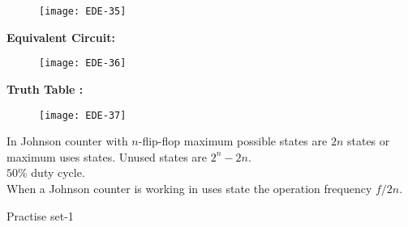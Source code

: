 \begin{enumerate}
\begin{figure}[H]
	\centering
	\texttt{[image: EDE-35]}
\end{figure}
\textbf { Equivalent Circuit: }
\begin{figure}[H]
	\centering
	\texttt{[image: EDE-36]}
\end{figure}
\textbf { Truth Table : }
\begin{figure}[H]
	\centering
	\texttt{[image: EDE-37]}
\end{figure}
In Johnson counter with $n$-flip-flop maximum possible states are $2 n$ states or maximum uses states. Unused states are $2^{n}-2 n$.\\
$50 \%$ duty cycle.\\
When a Johnson counter is working in uses state the operation frequency $f / 2 n$.\\
 \end{enumerate}
\newpage
\begin{abox}
	Practise set-1
\end{abox}
